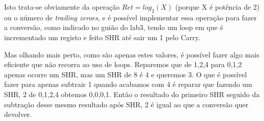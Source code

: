 \documentclass{article}
\begin{document}
\bigbreak
Isto trata-se obviamente da operação \( Ret = log_{2} (X) \) (porque X é potência de 2) ou o número de \textit{trailing zeroes}, e é possível implementar essa operação para fazer a conversão, como indicado no guião do lab3, tendo um loop em que é incrementado um registo e feito SHR até sair um 1 pelo Carry. 

\bigbreak
Mas olhando mais perto, como são apenas estes valores, é possível fazer algo mais eficiente que não recorra ao uso de loops. Reparemos que de 1,2,4 para 0,1,2 apenas ocorre um SHR, mas um SHR de 8 é 4 e queremos 3. O que é possível fazer para apenas subtrair 1 quando acabamos com 4 é reparar que fazendo um SHR, 2 de 0,1,2,4 obtemos 0,0,0,1. Então o resultado do primeiro SHR seguido da subtração desse mesmo resultado após SHR, 2 é igual ao que a conversão quer devolver.
\end{document}
